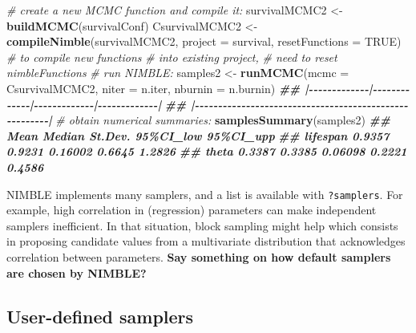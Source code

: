 \documentclass[
  12pt,
]{krantz}
\newenvironment{Shaded}{\begin{snugshade}}{\end{snugshade}}
\newcommand{\AttributeTok}[1]{\textcolor[rgb]{0.13,0.29,0.53}{#1}}
\newcommand{\CommentTok}[1]{\textcolor[rgb]{0.56,0.35,0.01}{\textit{#1}}}
\newcommand{\ConstantTok}[1]{\textcolor[rgb]{0.56,0.35,0.01}{#1}}
\newcommand{\DocumentationTok}[1]{\textcolor[rgb]{0.56,0.35,0.01}{\textbf{\textit{#1}}}}
\newcommand{\FunctionTok}[1]{\textcolor[rgb]{0.13,0.29,0.53}{\textbf{#1}}}
\newcommand{\NormalTok}[1]{#1}
\newcommand{\OtherTok}[1]{\textcolor[rgb]{0.56,0.35,0.01}{#1}}
\begin{document}
\begin{Shaded}
\begin{Highlighting}[]
\CommentTok{\# create a new MCMC function and compile it:}
\NormalTok{survivalMCMC2 }\OtherTok{\textless{}{-}} \FunctionTok{buildMCMC}\NormalTok{(survivalConf)}
\NormalTok{CsurvivalMCMC2 }\OtherTok{\textless{}{-}} \FunctionTok{compileNimble}\NormalTok{(survivalMCMC2, }
                                \AttributeTok{project =}\NormalTok{ survival,}
                                \AttributeTok{resetFunctions =} \ConstantTok{TRUE}\NormalTok{) }\CommentTok{\# to compile new functions }
                                                       \CommentTok{\# into existing project, }
                                                       \CommentTok{\# need to reset nimbleFunctions}
\CommentTok{\# run NIMBLE:}
\NormalTok{samples2 }\OtherTok{\textless{}{-}} \FunctionTok{runMCMC}\NormalTok{(}\AttributeTok{mcmc =}\NormalTok{ CsurvivalMCMC2, }
                    \AttributeTok{niter =}\NormalTok{ n.iter,}
                    \AttributeTok{nburnin =}\NormalTok{ n.burnin)}
\DocumentationTok{\#\# |{-}{-}{-}{-}{-}{-}{-}{-}{-}{-}{-}{-}{-}|{-}{-}{-}{-}{-}{-}{-}{-}{-}{-}{-}{-}{-}|{-}{-}{-}{-}{-}{-}{-}{-}{-}{-}{-}{-}{-}|{-}{-}{-}{-}{-}{-}{-}{-}{-}{-}{-}{-}{-}|}
\DocumentationTok{\#\# |{-}{-}{-}{-}{-}{-}{-}{-}{-}{-}{-}{-}{-}{-}{-}{-}{-}{-}{-}{-}{-}{-}{-}{-}{-}{-}{-}{-}{-}{-}{-}{-}{-}{-}{-}{-}{-}{-}{-}{-}{-}{-}{-}{-}{-}{-}{-}{-}{-}{-}{-}{-}{-}{-}{-}|}
\CommentTok{\# obtain numerical summaries:}
\FunctionTok{samplesSummary}\NormalTok{(samples2)}
\DocumentationTok{\#\#            Mean Median St.Dev. 95\%CI\_low 95\%CI\_upp}
\DocumentationTok{\#\# lifespan 0.9357 0.9231 0.16002    0.6645    1.2826}
\DocumentationTok{\#\# theta    0.3387 0.3385 0.06098    0.2221    0.4586}
\end{Highlighting}
\end{Shaded}

NIMBLE implements many samplers, and a list is available with \texttt{?samplers}. For example, high correlation in (regression) parameters can make independent samplers inefficient. In that situation, block sampling might help which consists in proposing candidate values from a multivariate distribution that acknowledges correlation between parameters. \textbf{Say something on how default samplers are chosen by NIMBLE?}

\hypertarget{user-defined-samplers}{%
\subsection{User-defined samplers}\label{user-defined-samplers}}
\end{document}
